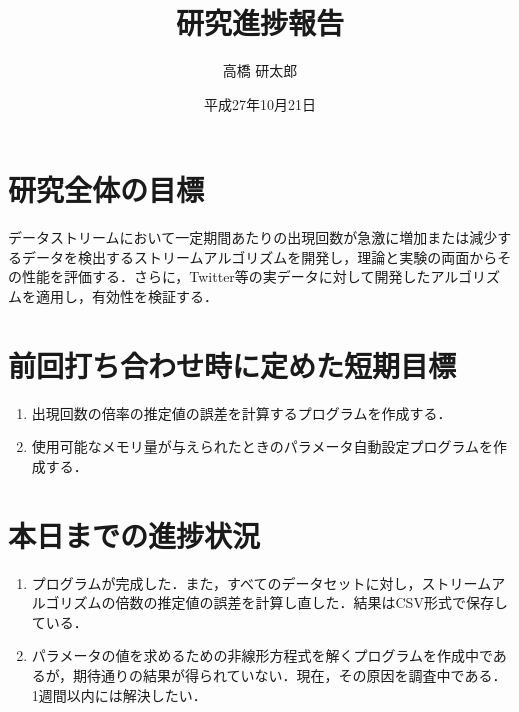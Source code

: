 \documentclass[11pt]{jarticle}
\title{研究進捗報告}
\author{高橋 研太郎}
\date{平成27年10月21日}
\begin{document}
%
\maketitle
\thispagestyle{empty}
%
\section{研究全体の目標}
データストリームにおいて一定期間あたりの出現回数が急激に増加または減少するデータを検出するストリームアルゴリズムを開発し，理論と実験の両面からその性能を評価する．さらに，Twitter等の実データに対して開発したアルゴリズムを適用し，有効性を検証する．
\section{前回打ち合わせ時に定めた短期目標}
\begin{enumerate}
\item 出現回数の倍率の推定値の誤差を計算するプログラムを作成する．
\item 使用可能なメモリ量が与えられたときのパラメータ自動設定プログラムを作成する．
\end{enumerate}
\section{本日までの進捗状況}
\begin{enumerate}
\item プログラムが完成した．また，すべてのデータセットに対し，ストリームアルゴリズムの倍数の推定値の誤差を計算し直した．結果はCSV形式で保存している．
\item パラメータの値を求めるための非線形方程式を解くプログラムを作成中であるが，期待通りの結果が得られていない．現在，その原因を調査中である．1週間以内には解決したい．
\end{enumerate}
\end{document}
